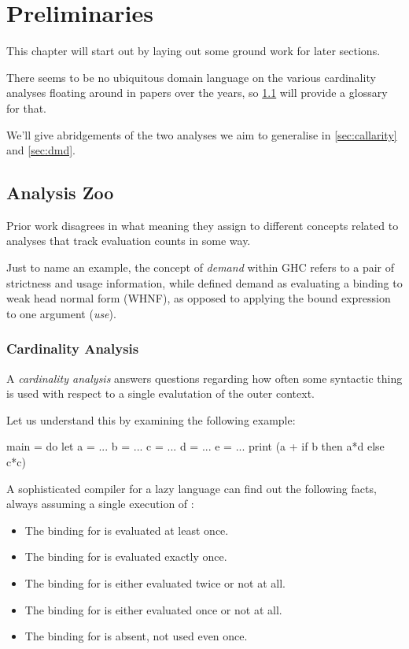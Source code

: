 \chapter{Preliminaries}\label{sec:prel}

This chapter will start out by laying out some ground work for later sections.

There seems to be no ubiquitous domain language on the various cardinality analyses floating around in papers over the years, so \cref{sec:zoo} will provide a glossary for that.

We'll give abridgements of the two analyses we aim to generalise in \cref{sec:callarity} and \cref{sec:dmd}.

\section{Analysis Zoo}\label{sec:zoo}

Prior work disagrees in what meaning they assign to different concepts related to analyses that track evaluation counts in some way.

Just to name an example, the concept of \emph{demand} within GHC refers to a pair of strictness and usage information, while \textcite[appendix~C.2]{warnsbrough} defined demand as evaluating a binding to weak head normal form (WHNF), as opposed to applying the bound expression to one argument (\emph{use}).

\subsection{Cardinality Analysis}\label{sec:card}

A \emph{cardinality analysis} answers questions regarding how often some syntactic thing is used with respect to a single evalutation of the outer context.

Let us understand this by examining the following example:

\begin{haskellcode}
  main = do
    let a = ...
        b = ...
        c = ...
        d = ...
        e = ...
    print (a + if b then a*d else c*c)
\end{haskellcode}

A sophisticated compiler for a lazy language can find out the following facts, always assuming a single execution of :
\begin{itemize}
  \item The binding for  is evaluated at least once.
  \item The binding for  is evaluated exactly once.
  \item The binding for  is either evaluated twice or not at all.
  \item The binding for  is either evaluated once or not at all.
  \item The binding for  is absent, \eg not used even once.
\end{itemize}

